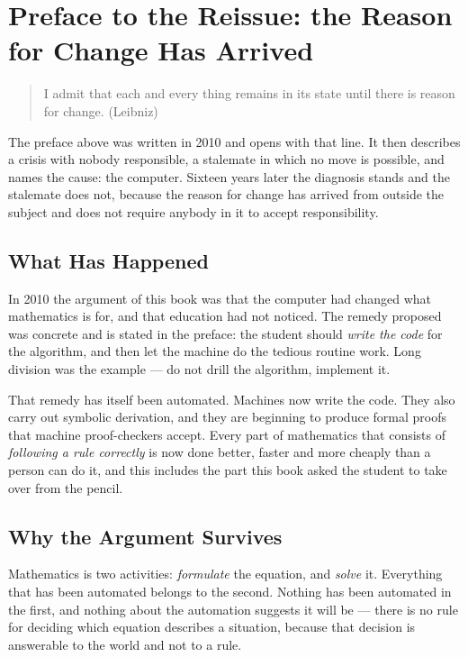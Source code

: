 
\section*{Preface to the Reissue: the Reason for Change Has Arrived}

\begin{quote}
I admit that each and every thing remains in its state until there is reason for change.
\hfill (Leibniz)
\end{quote}

\noindent The preface above was written in 2010 and opens with that line. It then describes a
crisis with nobody responsible, a stalemate in which no move is possible, and names the cause: the
computer. Sixteen years later the diagnosis stands and the stalemate does not, because the reason
for change has arrived from outside the subject and does not require anybody in it to accept
responsibility.

\subsection*{What Has Happened}

In 2010 the argument of this book was that the computer had changed what mathematics is for, and
that education had not noticed. The remedy proposed was concrete and is stated in the preface: the
student should \emph{write the code} for the algorithm, and then let the machine do the tedious
routine work. Long division was the example --- do not drill the algorithm, implement it.

That remedy has itself been automated. Machines now write the code. They also carry out symbolic
derivation, and they are beginning to produce formal proofs that machine proof-checkers accept.
Every part of mathematics that consists of \emph{following a rule correctly} is now done better,
faster and more cheaply than a person can do it, and this includes the part this book asked the
student to take over from the pencil.

\subsection*{Why the Argument Survives}

Mathematics is two activities: \emph{formulate} the equation, and \emph{solve} it. Everything that
has been automated belongs to the second. Nothing has been automated in the first, and nothing
about the automation suggests it will be --- there is no rule for deciding which equation describes
a situation, because that decision is answerable to the world and not to a rule.

